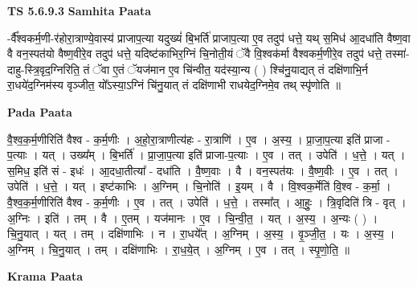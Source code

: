\documentclass[17pt]{extarticle}
\begin{document}
\textbf{TS 5.6.9.3 } \newline
\textbf{Samhita Paata} \newline

-र्वै᳚श्वकर्म॒णी-र॑होरा॒त्राण्ये॒वास्य॑ प्राजाप॒त्या यदुख्यं॑ बि॒भर्ति॑ प्राजाप॒त्या ए॒व तदुप॑ धत्ते॒ यथ् स॒मिध॑ आ॒दधा॑ति वैष्ण॒वा वै वन॒स्पत॑यो वैष्ण॒वीरे॒व तदुप॑ धत्ते॒ यदिष्ट॑काभिर॒ग्निं चि॒नोती॒यं ॅवै वि॒श्वक॑र्मा वैश्वकर्म॒णीरे॒व तदुप॑ धत्ते॒ तस्मा॑-दाहु-स्त्रि॒वृद॒ग्निरिति॒ तं ॅवा ए॒तं ॅयज॑मान ए॒व चि॑न्वीत॒ यद॑स्या॒न्य ( ) श्चि॑नु॒याद्यत् तं दक्षि॑णाभि॒र्न रा॒धये॑द॒ग्निम॑स्य वृञ्जीत॒ यो᳚ऽस्या॒ऽग्निं चि॑नु॒यात् तं दक्षि॑णाभी राधयेद॒ग्निमे॒व तथ् स्पृ॑णोति ॥ \newline

\textbf{Pada Paata} \newline

वै॒श्व॒क॒र्म॒णीरिति॑ वैश्व - क॒र्म॒णीः । अ॒हो॒रा॒त्राणीत्य॑हः - रा॒त्राणि॑ । ए॒व । अ॒स्य॒ । प्रा॒जा॒प॒त्या इति॑ प्राजा - प॒त्याः । यत् । उख्य᳚म् । बि॒भर्ति॑ । प्रा॒जा॒प॒त्या इति॑ प्राजा-प॒त्याः । ए॒व । तत् । उपेति॑ । ध॒त्ते॒ । यत् । स॒मिध॒ इति॑ सं - इधः॑ । आ॒दधा॒तीत्या᳚ - दधा॑ति । वै॒ष्ण॒वाः । वै । वन॒स्पत॑यः । वै॒ष्ण॒वीः । ए॒व । तत् । उपेति॑ । ध॒त्ते॒ । यत् । इष्ट॑काभिः । अ॒ग्निम् । चि॒नोति॑ । इ॒यम् । वै । वि॒श्वक॒र्मेति॑ वि॒श्व - क॒र्मा॒ । वै॒श्व॒क॒र्म॒णीरिति॑ वैश्व - क॒र्म॒णीः । ए॒व । तत् । उपेति॑ । ध॒त्ते॒ । तस्मा᳚त् । आ॒हुः॒ । त्रि॒वृदिति॑ त्रि - वृत् । अ॒ग्निः । इति॑ । तम् । वै । ए॒तम् । यज॑मानः । ए॒व । चि॒न्वी॒त॒ । यत् । अ॒स्य॒ । अ॒न्यः ( ) । चि॒नु॒यात् । यत् । तम् । दक्षि॑णाभिः । न । रा॒धये᳚त् । अ॒ग्निम् । अ॒स्य॒ । वृ॒ञ्जी॒त॒ । यः । अ॒स्य॒ । अ॒ग्निम् । चि॒नु॒यात् । तम् । दक्षि॑णाभिः । रा॒ध॒ये॒त् । अ॒ग्निम् । ए॒व । तत् । स्पृ॒णो॒ति॒ ॥  \newline


\textbf{Krama Paata} \newline
\end{document}
